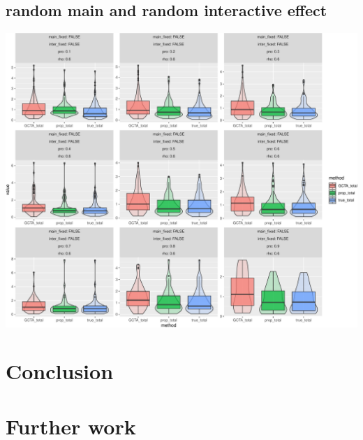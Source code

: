 \documentclass[]{article}
\begin{document}
\subsection{random main and random interactive
effect}\label{random-main-and-random-interactive-effect-1}

\includegraphics{Simulation_report_chi_resamle_files/figure-latex/random random p_6-1.pdf}

\section{Conclusion}\label{conclusion}

\section{Further work}\label{further-work}
\end{document}
